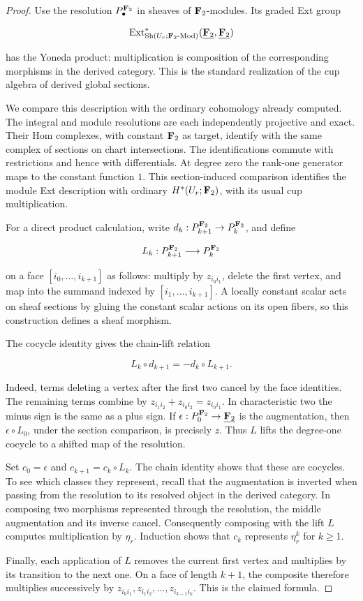 \begin{proof}
Use the resolution \(P_\bullet^{\mathbf F_2}\) in sheaves of \(\mathbf F_2\)-modules.
Its graded Ext group

\[
\operatorname{Ext}^*_{\operatorname{Sh}(U_r;\mathbf F_2\text{-}\mathrm{Mod})}
(\underline{\mathbf F_2},\underline{\mathbf F_2})
\]

has the Yoneda product: multiplication is composition of the
corresponding morphisms in the derived category. This is the standard
realization of the cup algebra of derived global sections.

We compare this description with the ordinary cohomology already
computed. The integral and module resolutions are each independently
projective and exact. Their Hom complexes, with constant \(\mathbf F_2\)
as target, identify with the same complex of sections on chart
intersections. The identifications commute with restrictions and
hence with differentials. At degree zero the rank-one generator maps
to the constant function \(1\). This section-induced comparison
identifies the module Ext description with ordinary
\(H^*(U_r;\mathbf F_2)\), with its usual cup multiplication.

For a direct product calculation, write
\(d_k:P_{k+1}^{\mathbf F_2}\to P_k^{\mathbf F_2}\), and define

\[
L_k:P_{k+1}^{\mathbf F_2}\longrightarrow P_k^{\mathbf F_2}
\]

on a face \([i_0,\ldots,i_{k+1}]\) as follows: multiply by
\(z_{i_0i_1}\), delete the first vertex, and map into the summand
indexed by \([i_1,\ldots,i_{k+1}]\). A locally constant scalar
acts on sheaf sections by gluing the constant scalar actions on its
open fibers, so this construction defines a sheaf morphism.

The cocycle identity gives the chain-lift relation

\[
L_k\circ d_{k+1}=-d_k\circ L_{k+1}.
\]

Indeed, terms deleting a vertex after the first two cancel by the
face identities. The remaining terms combine by
\(z_{i_1i_2}+z_{i_0i_2}=z_{i_0i_1}\). In characteristic two the
minus sign is the same as a plus sign. If
\(\epsilon:P_0^{\mathbf F_2}\to\underline{\mathbf F_2}\) is the augmentation,
then \(\epsilon\circ L_0\), under the section comparison, is
precisely \(z\). Thus \(L\) lifts the degree-one cocycle to a
shifted map of the resolution.

Set \(c_0=\epsilon\) and \(c_{k+1}=c_k\circ L_k\).
The chain identity shows that these are cocycles. To see which classes
they represent, recall that the augmentation is inverted when
passing from the resolution to its resolved object in the derived
category. In composing two morphisms represented through the
resolution, the middle augmentation and its inverse cancel.
Consequently composing with the lift \(L\) computes multiplication
by \(\eta_r\). Induction shows that \(c_k\) represents
\(\eta_r^k\) for \(k\geq1\).

Finally, each application of \(L\) removes the current first vertex
and multiplies by its transition to the next one. On a face of length
\(k+1\), the composite therefore multiplies successively by
\(z_{i_0i_1},z_{i_1i_2},\ldots,z_{i_{k-1}i_k}\). This is the
claimed formula.
\end{proof}

